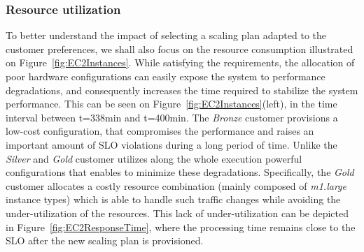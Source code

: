 \subsubsection{Resource utilization} 
To better understand the impact of selecting a scaling plan adapted to the customer preferences, we shall also focus on the resource consumption illustrated on Figure~\ref{fig:EC2Instances}. While satisfying the requirements, the allocation of poor hardware configurations can easily expose the system to performance degradations, and consequently increases the time required to stabilize the system performance. This can be seen on  Figure~\ref{fig:EC2Instances}(left), in the time interval between t=338min and t=400min. The \emph{Bronze} customer provisions a low-cost configuration, that compromises the performance and raises an important amount of SLO violations during a long period of time. Unlike the \emph{Silver} and \emph{Gold} customer utilizes along the whole execution powerful configurations that enables to minimize these degradations. Specifically, the \emph{Gold} customer allocates a costly resource combination (mainly composed of \emph{m1.large} instance types) which is able to handle such traffic changes while avoiding the under-utilization of the resources. This lack of under-utilization can be depicted in Figure~\ref{fig:EC2ResponseTime}, where the processing time remains close to the SLO after the new scaling plan is provisioned.


